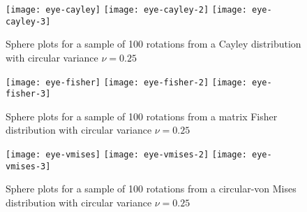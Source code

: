 \begin{figure}
\texttt{[image: eye-cayley]}
\texttt{[image: eye-cayley-2]}
\texttt{[image: eye-cayley-3]}
\caption{\label{fig:eye-cayley}Sphere plots for a sample of 100 rotations from a Cayley distribution with circular variance $\nu=0.25$}
\end{figure}
\begin{figure}
\texttt{[image: eye-fisher]}
\texttt{[image: eye-fisher-2]}
\texttt{[image: eye-fisher-3]}
\caption{\label{fig:eye-fisher}Sphere plots for a sample of 100 rotations from a matrix Fisher distribution with circular variance $\nu=0.25$}
\end{figure}
\begin{figure}
\texttt{[image: eye-vmises]}
\texttt{[image: eye-vmises-2]}
\texttt{[image: eye-vmises-3]}
\caption{\label{fig:eye-vmises}Sphere plots for a sample of 100 rotations from a circular-von Mises distribution with circular variance $\nu=0.25$}
\end{figure}